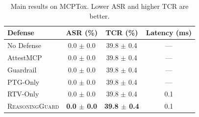 \begin{table}[t]
\centering
\small
\begin{tabular}{lccc}
\toprule
Defense & ASR (\%) & TCR (\%) & Latency (ms) \\
\midrule
No Defense & 0.0 $\pm$ 0.0 & 39.8 $\pm$ 0.4 & --- \\
AttestMCP & 0.0 $\pm$ 0.0 & 39.8 $\pm$ 0.4 & --- \\
Guardrail & 0.0 $\pm$ 0.0 & 39.8 $\pm$ 0.4 & --- \\
PTG-Only & 0.0 $\pm$ 0.0 & 39.8 $\pm$ 0.4 & --- \\
RTV-Only & 0.0 $\pm$ 0.0 & 39.8 $\pm$ 0.4 & 0.1 \\
\textsc{ReasoningGuard} & \textbf{0.0 $\pm$ 0.0} & \textbf{39.8 $\pm$ 0.4} & 0.1 \\
\bottomrule
\end{tabular}
\caption{Main results on MCPTox. Lower ASR and higher TCR are better.}
\label{tab:main}
\end{table}
